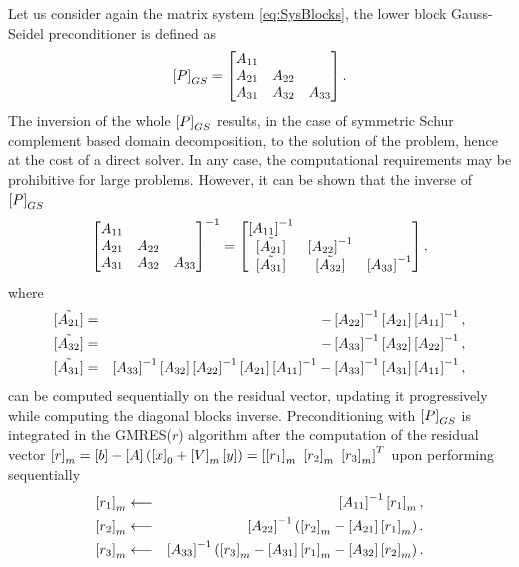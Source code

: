 Let us consider again the matrix system \eqref{eq:SysBlocks}, the lower block Gauss-Seidel preconditioner is defined as
\begin{equation}
\label{eq:gs}
\left[P\right]_{GS}
=
\begin{bmatrix}
A_{11} &  & \\
A_{21} & A_{22} & \\
A_{31} & A_{32} & A_{33}
\end{bmatrix}.
\end{equation}
\noindent The inversion of the whole $\left[P\right]_{GS}$ results, in the case of symmetric Schur complement based domain decomposition, to the solution of the problem, hence at the cost of a direct solver. In any case, the computational requirements may be prohibitive for large problems. However, it can be shown that the inverse of $\left[P\right]_{GS}$
\begin{gather}
\begin{bmatrix}
A_{11} &  & \\
A_{21} & A_{22} & \\
A_{31} & A_{32} & A_{33}
\end{bmatrix}^{-1} = 
\begin{bmatrix}
\left[A_{11}\right]^{-1} &  & \\
\tilde{\left[A_{21}\right]} & \left[A_{22}\right]^{-1} & \\
\tilde{\left[A_{31}\right]} & \tilde{\left[A_{32}\right]} & \left[A_{33}\right]^{-1}
\end{bmatrix},
\end{gather}
\noindent where
\begin{eqnarray*}
\tilde{\left[A_{21}\right]} &= &-\left[A_{22}\right]^{-1}\left[A_{21}\right]\left[A_{11}\right]^{-1},\\
\tilde{\left[A_{32}\right]} &= &-\left[A_{33}\right]^{-1} \left[A_{32}\right] \left[A_{22}\right]^{-1},\\
\tilde{\left[A_{31}\right]} &= &\left[A_{33}\right]^{-1}\left[A_{32}\right]\left[A_{22}\right]^{-1}\left[A_{21}\right]\left[A_{11}\right]^{-1}- \left[A_{33}\right]^{-1}\left[A_{31}\right]\left[A_{11}\right]^{-1},
\end{eqnarray*}
\noindent can be computed sequentially on the residual vector, updating it progressively while computing the diagonal blocks inverse. Preconditioning with $\left[P\right]_{GS}$ is integrated in the GMRES($r$) algorithm after the computation of the residual vector $\vect{r}_m = \vect{b} - \mat{A} (\vect{x}_0 + \mat{V}_m \vect{y}) = \vect{\vect{r_1}_m \ \vect{r_2}_m \ \vect{r_3}_m}^T$ upon performing sequentially
\begin{eqnarray*}
\left[{{r_1}}\right]_m &\longleftarrow & \left[A_{11}\right]^{-1}\left[{{r_1}}\right]_m, \\
\left[{{r_2}}\right]_m &\longleftarrow & \left[A_{22}\right]^{-1}\left(\left[{{r_2}}\right]_m - \left[A_{21}\right] \left[{{r_1}}\right]_m \right).\\
\left[{{r_3}}\right]_m &\longleftarrow & \left[A_{33}\right]^{-1}\left(\left[{{r_3}}\right]_m - \left[A_{31}\right] \left[{{r_1}}\right]_m - \left[A_{32}\right] \left[{{r_2}}\right]_m\right).\\
\end{eqnarray*}


